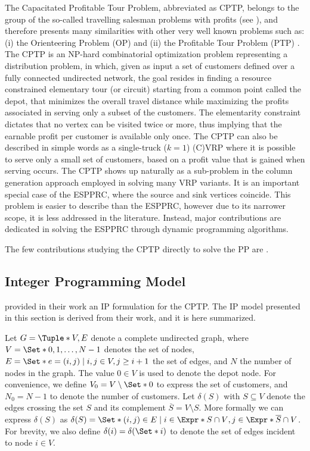 The Capacitated Profitable Tour Problem, abbreviated as CPTP,
belongs to the group of the so-called travelling salesman
problems with profits (see \cite{feillet2005}),
and therefore presents many similarities with other very well known
problems such as:
(i) the Orienteering Problem (OP) \parencite{golden1987, laporte1990}
and (ii) the Profitable Tour Problem (PTP) \parencite{dellamico1995}.
The CPTP is an NP-hard combinatorial optimization problem representing
a distribution problem, in which,
given as input a set of customers
defined over a fully connected undirected network, the goal resides in finding
a resource constrained elementary tour (or circuit) starting from a common point called the depot,
that minimizes the overall travel distance while maximizing
the profits associated in serving only a subset of the customers.
The elementarity constraint dictates that no vertex
can be visited twice or more, thus implying that the earnable profit
per customer is available only once.
The CPTP can also be described in simple words
as a single-truck ($k = 1$) (C)VRP where it is possible to serve only a small set of customers,
based on a profit value that is gained when serving occurs.
The CPTP shows up naturally as a sub-problem in the column generation approach employed in solving many VRP variants.
It is an important special case of the ESPPRC, where the source and sink vertices coincide.
This problem is easier to describe than the ESPPRC,
however due to its narrower scope,
it is less addressed in the literature.
Instead, major contributions are dedicated in solving the ESPPRC through dynamic programming algorithms.

The few contributions studying the CPTP directly to solve the PP
are \cite{jepsen2011, jepsen2014}.

\subsection{Integer Programming Model}
\label{sec:cptp-integer-programming-model}

\textcite{letchford2013, jepsen2014} provided in their work an IP formulation for the CPTP.
The IP model presented in this section is derived from their work, and it is here summarized.

Let $G = \Tuple*{V, E}$ denote a complete undirected graph, where $V = \Set*{0, 1, \dots, N - 1}$ denotes the set of nodes,
$E = \Set*{e = (i, j) \mid i,j \in V, j \ge i + 1}$ the set of edges, and $N$ the number of nodes in the graph.
The value $0 \in V$ is used to denote the depot node.
For convenience, we define $V_0 = V \setminus \Set*{0}$ to express the set of customers, and $N_0 = N - 1$ to denote the number of customers.
Let $\delta(S)$ with $S \subseteq V$ denote the edges crossing the set $S$ and its complement $\overline{S} = V \setminus S$.
More formally we can express $\delta(S)$ as $\delta(S) = \Set*{ (i, j) \in E \mid i \in \Expr*{S \cap V}, j \in \Expr*{ \overline{S} \cap V } }$.
For brevity, we also define $\delta(i) = \delta(\Set*{i})$ to denote the set of edges incident to node $i \in V$.

